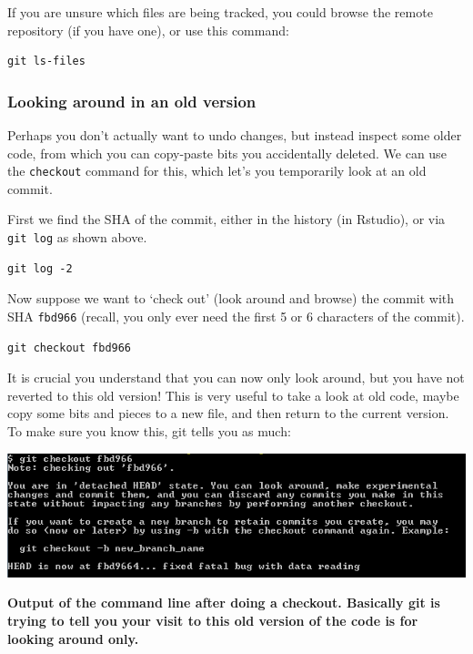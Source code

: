 \documentclass[]{book}
\begin{document}
If you are unsure which files are being tracked, you could browse the remote repository (if you have one), or use this command:

\begin{verbatim}
git ls-files
\end{verbatim}

\hypertarget{looking-around-in-an-old-version}{%
\subsubsection{Looking around in an old version}\label{looking-around-in-an-old-version}}

Perhaps you don't actually want to undo changes, but instead inspect some older code, from which you can copy-paste bits you accidentally deleted. We can use the \texttt{checkout} command for this, which let's you temporarily look at an old commit.

First we find the SHA of the commit, either in the history (in Rstudio), or via \texttt{git\ log} as shown above.

\begin{verbatim}
git log -2
\end{verbatim}

Now suppose we want to `check out' (look around and browse) the commit with SHA \texttt{fbd966} (recall, you only ever need the first 5 or 6 characters of the commit).

\begin{verbatim}
git checkout fbd966
\end{verbatim}

It is crucial you understand that you can now only look around, but you have not reverted to this old version! This is very useful to take a look at old code, maybe copy some bits and pieces to a new file, and then return to the current version. To make sure you know this, git tells you as much:

\includegraphics[width=0.75\linewidth]{screenshots/gitcheckoutoutput}

\textbf{Output of the command line after doing a checkout. Basically git is trying to tell you your visit to this old version of the code is for looking around only.}
\end{document}
